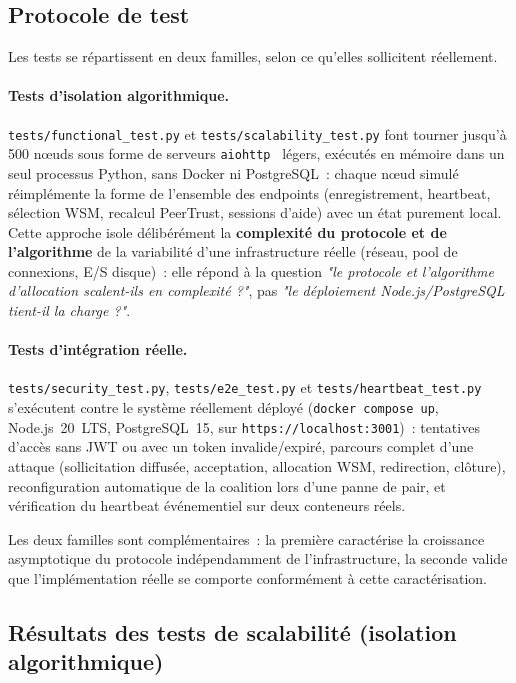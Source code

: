 \subsection{Protocole de test}

Les tests se répartissent en deux familles, selon ce qu'elles sollicitent réellement.

\paragraph{Tests d'isolation algorithmique.} \texttt{tests/functional\_test.py} et \texttt{tests/scalability\_test.py} font tourner jusqu'à 500 nœuds sous forme de serveurs \texttt{aiohttp}~\parencite{aiohttp2024} légers, exécutés en mémoire dans un seul processus Python, sans Docker ni PostgreSQL~: chaque nœud simulé réimplémente la forme de l'ensemble des endpoints (enregistrement, heartbeat, sélection WSM, recalcul PeerTrust, sessions d'aide) avec un état purement local. Cette approche isole délibérément la \textbf{complexité du protocole et de l'algorithme} de la variabilité d'une infrastructure réelle (réseau, pool de connexions, E/S disque)~: elle répond à la question \emph{"le protocole et l'algorithme d'allocation scalent-ils en complexité ?"}, pas \emph{"le déploiement Node.js/PostgreSQL tient-il la charge ?"}.

\paragraph{Tests d'intégration réelle.} \texttt{tests/security\_test.py}, \texttt{tests/e2e\_test.py} et \texttt{tests/heartbeat\_test.py} s'exécutent contre le système réellement déployé (\texttt{docker compose up}, Node.js~20~LTS, PostgreSQL~15, sur \texttt{https://localhost:3001})~: tentatives d'accès sans JWT ou avec un token invalide/expiré, parcours complet d'une attaque (sollicitation diffusée, acceptation, allocation WSM, redirection, clôture), reconfiguration automatique de la coalition lors d'une panne de pair, et vérification du heartbeat événementiel sur deux conteneurs réels.

Les deux familles sont complémentaires~: la première caractérise la croissance asymptotique du protocole indépendamment de l'infrastructure, la seconde valide que l'implémentation réelle se comporte conformément à cette caractérisation.

\subsection{Résultats des tests de scalabilité (isolation algorithmique)}

